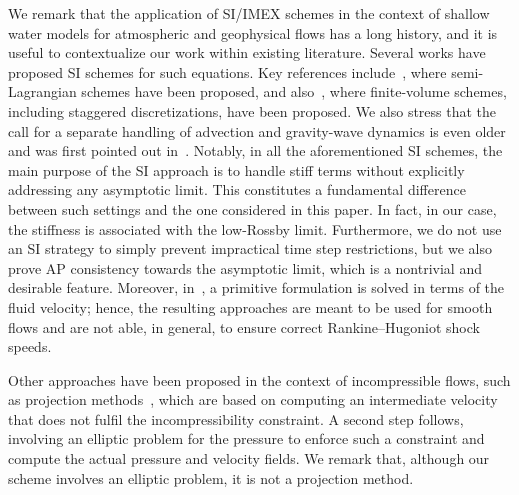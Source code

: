 \documentclass[a4paper,11pt,twoside]{article}
\numberwithin{equation}{section}
\numberwithin{figure}{section}
\numberwithin{table}{section}
\newcommand{\RIIIcolor}[1]{{\leavevmode\color{magenta} #1}}
\begin{document}
\RIIIcolor{
	We remark that the application of SI/IMEX schemes in the context of shallow water models for atmospheric and geophysical flows has a long history, and it is useful to contextualize our work within existing literature.
	Several works have proposed SI schemes for such equations.
	Key references include~\cite{temperton1987efficient,ritchie1988application,staniforth1991semi}, where semi-Lagrangian schemes have been proposed, and also~\cite{smolarkiewicz2016finite,thuburn2014mimetic,weller2014non}, where finite-volume schemes, including staggered discretizations, have been proposed.
	We also stress that the call for a separate handling of advection and gravity-wave dynamics is even older and was first pointed out in~\cite{machenhauer1977dynamics}.
	Notably, in all the aforementioned SI schemes, the main purpose of the SI approach is to handle stiff terms without explicitly addressing any asymptotic limit.
	This constitutes a fundamental difference between such settings and the one considered in this paper. In fact, in our case, the stiffness is associated with the low-Rossby limit. Furthermore, we do not use an SI strategy to simply prevent impractical time step restrictions, but we also prove AP consistency towards the asymptotic limit, which is a nontrivial and desirable feature.
	Moreover, in~\cite{temperton1987efficient,ritchie1988application,staniforth1991semi,thuburn2014mimetic,weller2014non}, a primitive formulation is solved in terms of the fluid velocity; hence, the resulting approaches are meant to be used for smooth flows and are not able, in general, to ensure correct Rankine--Hugoniot shock speeds.
	
	Other approaches have been proposed in the context of incompressible flows, such as projection methods~\cite{chorin1968numerical,harlow1965numerical}, which are based on computing an intermediate velocity that does not fulfil the incompressibility constraint. A second step follows, involving an elliptic problem for the pressure to enforce such a constraint and compute the actual pressure and velocity fields.
	We remark that, although our scheme involves an elliptic problem, it is not a projection method.
}
\end{document}
